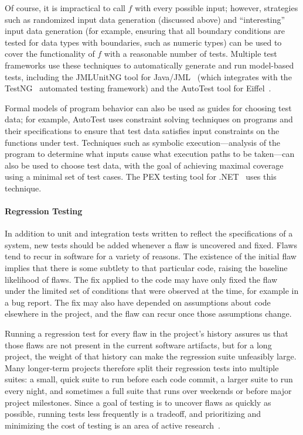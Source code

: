 Of course, it is impractical to call $f$ with every possible input;
however, strategies such as randomized input data generation
(discussed above) and ``interesting'' input data generation (for
example, ensuring that all boundary conditions are tested for data
types with boundaries, such as numeric types) can be used to cover the
functionality of $f$ with a reasonable number of tests. Multiple test
frameworks use these techniques to automatically generate and run
model-based tests, including the JMLUnitNG tool for
Java/JML~\cite{ZimmermanNagmoti10} (which integrates with the
TestNG~\cite{TestNG} automated testing framework) and the AutoTest
tool for Eiffel~\cite{AutoTest10}.

Formal models of program behavior can also be used as guides for
choosing test data; for example, AutoTest uses constraint solving
techniques on programs and their specifications to ensure that test
data satisfies input constraints on the functions under test.
Techniques such as symbolic execution---analysis of the program to
determine what inputs cause what execution paths to be taken---can
also be used to choose test data, with the goal of achieving maximal
coverage using a minimal set of test cases. The PEX testing tool for
.NET~\cite{PEX08} uses this technique.

\paragraph{Regression Testing}

In addition to unit and integration tests written to reflect the
specifications of a system, new tests should be added whenever a flaw
is uncovered and fixed. Flaws tend to recur in software for a variety
of reasons. The existence of the initial flaw implies that there is
some subtlety to that particular code, raising the baseline likelihood
of flaws. The fix applied to the code may have only fixed the flaw
under the limited set of conditions that were observed at the time,
for example in a bug report. The fix may also have depended on
assumptions about code elsewhere in the project, and the flaw can
recur once those assumptions change.

Running a regression test for every flaw in the project's history
assures us that those flaws are not present in the current software
artifacts, but for a long project, the weight of that history can make
the regression suite unfeasibly large. Many longer-term projects
therefore split their regression tests into multiple suites: a small,
quick suite to run before each code commit, a larger suite to run
every night, and sometimes a full suite that runs over weekends or
before major project milestones. Since a goal of testing is to uncover
flaws as quickly as possible, running tests less frequently is a
tradeoff, and prioritizing and minimizing the cost of testing is an
area of active research~\cite{yoo2012regression}.

